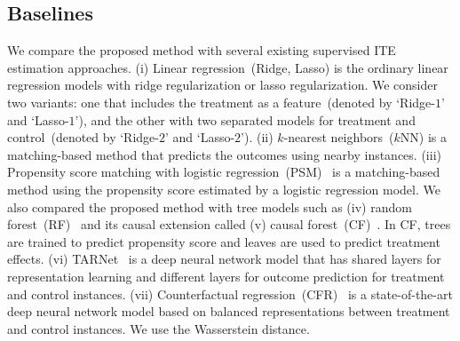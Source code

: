 \subsection{Baselines}
We compare the proposed method with several existing supervised ITE estimation approaches.
(i) Linear regression~(Ridge, Lasso) is the ordinary linear regression models with ridge regularization or lasso regularization. 
We consider two variants: one that includes the treatment as a feature~(denoted by `Ridge-$1$' and `Lasso-$1$'),
and the other with two separated models for treatment and control~(denoted by `Ridge-$2$' and `Lasso-$2$').  
(ii) $k$-nearest neighbors~($k$NN) is a matching-based method that predicts the outcomes using nearby instances.
(iii) Propensity score matching with logistic regression~(PSM)~\cite{rosenbaum1983central} is a matching-based method using the propensity score estimated by a logistic regression model.
We also compared the proposed method with tree models such as  (iv) random forest~(RF)~\cite{breiman2001random} and its causal extension called (v) causal forest~(CF)~\cite{wager2018estimation}. 
In CF, trees are trained to predict propensity score and leaves are used to predict treatment effects. 
(vi) TARNet~\cite{shalit2017estimating}  is a deep neural network model that has shared layers for representation learning and different layers for outcome prediction for treatment and control instances. 
(vii) Counterfactual regression~(CFR)~\cite{shalit2017estimating} is a  state-of-the-art deep neural network model based on balanced representations between treatment and control instances. We use the Wasserstein distance. 



